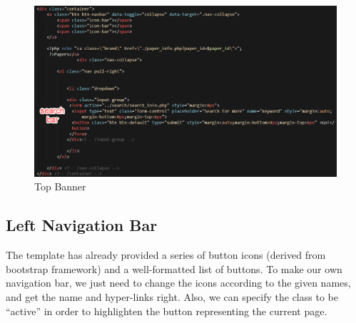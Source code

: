 \documentclass{book}
\begin{document}
\begin{figure}[H]
\centering{}
\includegraphics[scale=0.35]{img/zlt_beau_codes.png}
\caption{Top Banner}
\end{figure}


\subsection {Left Navigation Bar}

The template has already provided a series of button icons (derived from bootstrap framework) and a well-formatted list of buttons. To make our own navigation bar, we just need to change the icons according to the given names, and get the name and hyper-links right. Also, we can specify the class to be ``active'' in order to highlighten the button representing the current page.
\end{document}
